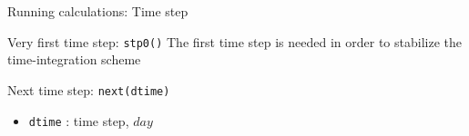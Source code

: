 \documentclass[11pt]{beamer}
\begin{document}
\begin{frame}{Running calculations: Time step}
  
  \footnotesize

  \begin{block}{Very first time step: \texttt{stp0()}}
  The first time step is needed in order to stabilize the time-integration scheme
  \end{block}

  \begin{block}{Next time step: \texttt{next(dtime)}}
    \begin{itemize}
    \item \texttt{dtime} : time step, $day$
    \end{itemize}
  \end{block}

\end{frame}
\end{document}
